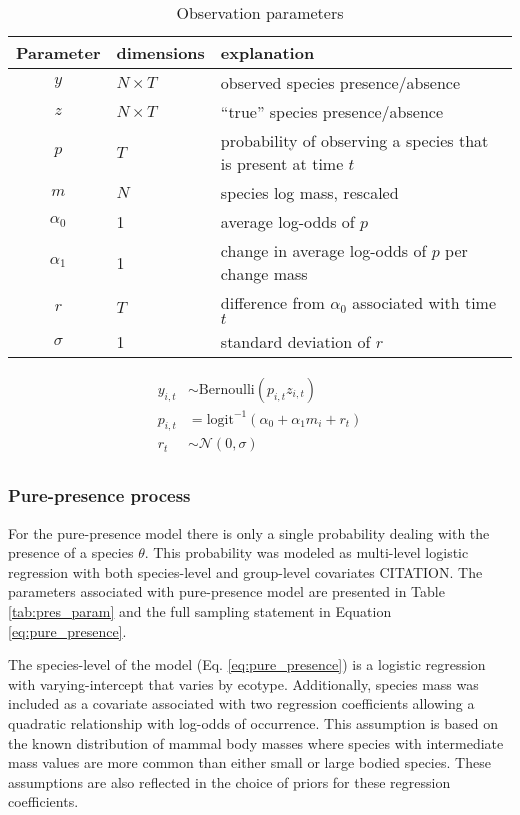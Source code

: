 \documentclass[12pt,letterpaper]{article}
\begin{document}
\begin{table}
  \centering
  \caption{Observation parameters}
  \begin{tabular}{c l l}
    Parameter & dimensions & explanation \\
    \hline
    \(y\) & \(N \times T\) & observed species presence/absence \\
    \(z\) & \(N \times T\) & ``true'' species presence/absence \\
    \(p\) & \(T\) & probability of observing a species that is present at time \(t\) \\
    \(m\) & \(N\) & species log mass, rescaled \\
    \(\alpha_{0}\) & 1 & average log-odds of \(p\) \\ %
    \(\alpha_{1}\) & 1 & change in average log-odds of \(p\) per change mass \\
    \(r\) & \(T\) & difference from \(\alpha_{0}\) associated with time \(t\) \\
    \(\sigma\) & 1 & standard deviation of \(r\) \\
  \end{tabular}
  \label{tab:obs_param}
\end{table}

\begin{equation}
  \begin{aligned}
    y_{i, t} &\sim \text{Bernoulli}(p_{i, t} z_{i, t}) \\
    p_{i, t} &= \text{logit}^{-1}(\alpha_{0} + \alpha_{1} m_{i} + r_{t}) \\ 
    r_{t} &\sim \mathcal{N}(0, \sigma) \\
  \end{aligned}
  \label{eq:obs_model}
\end{equation}


\subsubsection*{Pure-presence process}
For the pure-presence model there is only a single probability dealing with the presence of a species \(\theta\). This probability was modeled as multi-level logistic regression with both species-level and group-level covariates CITATION. The parameters associated with pure-presence model are presented in Table \ref{tab:pres_param} and the full sampling statement in Equation \ref{eq:pure_presence}.

The species-level of the model (Eq. \ref{eq:pure_presence}) is a logistic regression with varying-intercept that varies by ecotype. Additionally, species mass was included as a covariate associated with two regression coefficients allowing a quadratic relationship with log-odds of occurrence. This assumption is based on the known distribution of mammal body masses where species with intermediate mass values are more common than either small or large bodied species. These assumptions are also reflected in the choice of priors for these regression coefficients.
\end{document}
